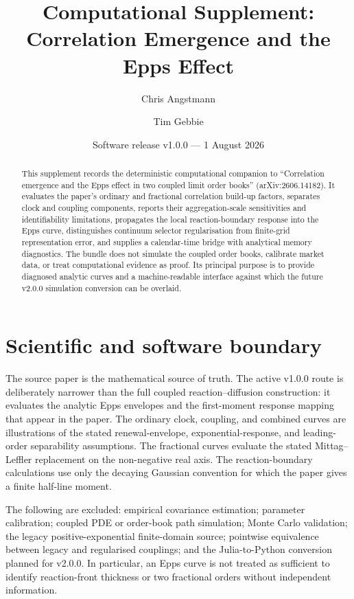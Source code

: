 \documentclass[11pt]{article}
\title{Computational Supplement:\\Correlation Emergence and the Epps Effect}
\author{Chris Angstmann \and Tim Gebbie}
\date{Software release v1.0.0 --- 1 August 2026}
\begin{document}
\maketitle

\begin{abstract}
This supplement records the deterministic computational companion to ``Correlation emergence and the Epps effect in two coupled limit order books'' (arXiv:2606.14182). It evaluates the paper's ordinary and fractional correlation build-up factors, separates clock and coupling components, reports their aggregation-scale sensitivities and identifiability limitations, propagates the local reaction-boundary response into the Epps curve, distinguishes continuum selector regularisation from finite-grid representation error, and supplies a calendar-time bridge with analytical memory diagnostics. The bundle does not simulate the coupled order books, calibrate market data, or treat computational evidence as proof. Its principal purpose is to provide diagnosed analytic curves and a machine-readable interface against which the future v2.0.0 simulation conversion can be overlaid.
\end{abstract}

\tableofcontents

\section{Scientific and software boundary}

The source paper is the mathematical source of truth. The active v1.0.0 route is deliberately narrower than the full coupled reaction--diffusion construction: it evaluates the analytic Epps envelopes and the first-moment response mapping that appear in the paper. The ordinary clock, coupling, and combined curves are illustrations of the stated renewal-envelope, exponential-response, and leading-order separability assumptions. The fractional curves evaluate the stated Mittag--Leffler replacement on the non-negative real axis. The reaction-boundary calculations use only the decaying Gaussian convention for which the paper gives a finite half-line moment.

The following are excluded: empirical covariance estimation; parameter calibration; coupled PDE or order-book path simulation; Monte Carlo validation; the legacy positive-exponential finite-domain source; pointwise equivalence between legacy and regularised couplings; and the Julia-to-Python conversion planned for v2.0.0. In particular, an Epps curve is not treated as sufficient to identify reaction-front thickness or two fractional orders without independent information.
\end{document}
